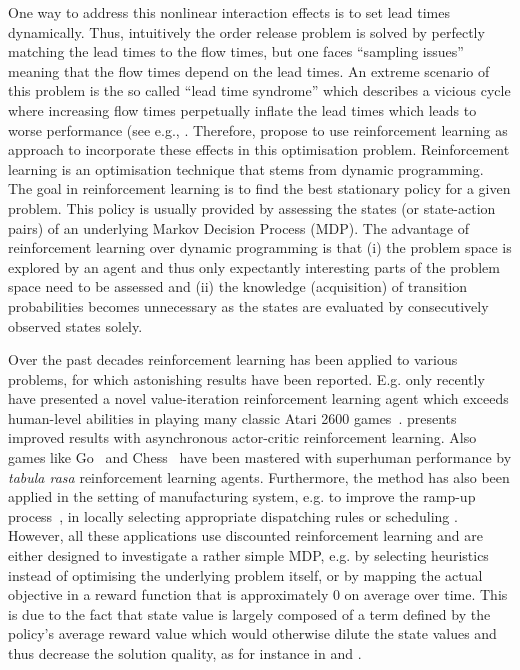 \documentclass[envcountsame]{llncs}
\begin{document}
One way to address this nonlinear interaction effects is to set lead times dynamically. Thus,
intuitively the order release problem is solved by perfectly matching the lead times to the flow
times, but one faces ``sampling issues'' meaning that the flow times depend on the lead times. An
extreme scenario of this problem is the so called ``lead time syndrome'' which describes a vicious
cycle where increasing flow times perpetually inflate the lead times which leads to worse
performance (see e.g., \citealt{Mather1978, knollmann2013control, Selcuk2006}. Therefore,
\cite{SchneckenreitherHaeussler2019} propose to use reinforcement learning as approach to
incorporate these effects in this optimisation problem. Reinforcement learning is an optimisation
technique that stems from dynamic programming. The goal in reinforcement learning is to find the
best stationary policy for a given problem. This policy is usually provided by assessing the states
(or state-action pairs) of an underlying Markov Decision Process (MDP). The advantage of
reinforcement learning over dynamic programming is that (i) the problem space is explored by an
agent and thus only expectantly interesting parts of the problem space need to be assessed and (ii)
the knowledge (acquisition) of transition probabilities becomes unnecessary as the states are
evaluated by consecutively observed states solely.

Over the past decades reinforcement learning has been applied to various problems, for which
astonishing results have been reported. E.g. only recently \cite{mnih2015human} have presented a novel
value-iteration reinforcement learning agent which exceeds human-level abilities in playing many
classic Atari 2600 games~\citep{bellemare2012investigating}. \cite{mnih2016asynchronous} presents
improved results with asynchronous actor-critic reinforcement learning. Also games like
Go~\citep{silver2016mastering} and Chess~\citep{silver2017mastering} have been mastered with
superhuman performance by \textit{tabula rasa} reinforcement learning agents. Furthermore, the
method has also been applied in the setting of manufacturing system, e.g. to improve the ramp-up
process~\citep{doltsinis2012reinforcement}, in locally selecting appropriate dispatching rules
\citep{zhang1995reinforcement,wang2005application} or scheduling
\citep{zhang1995reinforcement, waschneck2018optimization}.
%
However, all these applications use discounted reinforcement learning and are either designed to
investigate a rather simple MDP, e.g. by selecting heuristics instead of optimising the underlying
problem itself, or by mapping the actual objective in a reward function that is approximately \(0\)
on average over time.
%
This is due to the fact that state value is largely composed of a term defined by the policy's
average reward value \citep{MillerVeinott1969,Blackwell62} which would otherwise dilute the state
values and thus decrease the solution quality, as for instance in
\cite{SchneckenreitherHaeussler2019} and \cite{gijsbrechts2018can}.
%
\end{document}
